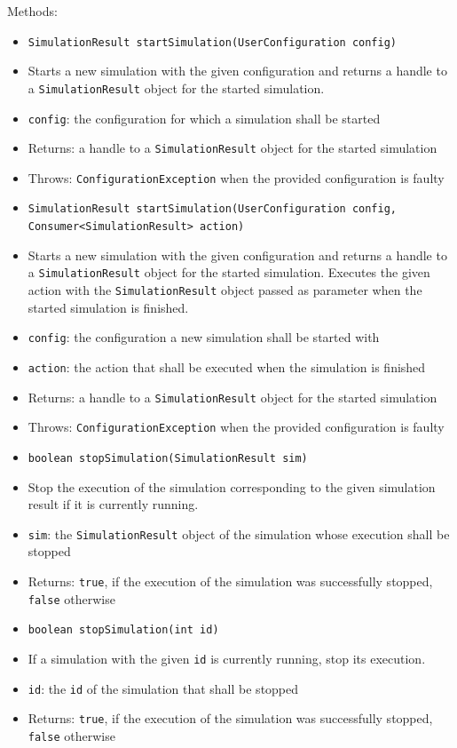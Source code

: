 \documentclass[parskip=full,11pt]{scrartcl}
\begin{document}
Methods:
\begin{itemize} \itemsep -10pt
	\item \texttt{SimulationResult startSimulation(UserConfiguration config)}
	\item[] Starts a new simulation with the given configuration and returns a handle to a \texttt{SimulationResult} object for the started simulation.
	\item[]\texttt{config}: the configuration for which a simulation shall be started
	\item[] Returns: a handle to a \texttt{SimulationResult} object for the started simulation
	\item[] Throws: \texttt{ConfigurationException} when the provided configuration is faulty

	\item \texttt{SimulationResult startSimulation(UserConfiguration config, Consumer<SimulationResult> action)}
	\item[] Starts a new simulation with the given configuration and returns a handle to a \texttt{SimulationResult} object for the started simulation. Executes the given action with the \texttt{SimulationResult} object passed as parameter when the started simulation is finished.
	\item[] \texttt{config}: the configuration a new simulation shall be started with
	\item[] \texttt{action}: the action that shall be executed when the simulation is finished
	\item[] Returns: a handle to a \texttt{SimulationResult} object for the started simulation
	\item[] Throws: \texttt{ConfigurationException} when the provided configuration is faulty
	\newpage
	\item \texttt{boolean stopSimulation(SimulationResult sim)}
	\item[] Stop the execution of the simulation corresponding to the given simulation result if it is currently running.
	\item[] \texttt{sim}: the \texttt{SimulationResult} object of the simulation whose execution shall be stopped
	\item[] Returns: \texttt{true}, if the execution of the simulation was successfully stopped, \texttt{false} otherwise

	\item \texttt{boolean stopSimulation(int id)}
	\item[] If a simulation with the given \texttt{id} is currently running, stop its execution.
	\item[] \texttt{id}: the \texttt{id} of the simulation that shall be stopped
	\item[] Returns: \texttt{true}, if the execution of the simulation was successfully stopped, \texttt{false} otherwise


\end{itemize}
\end{document}
